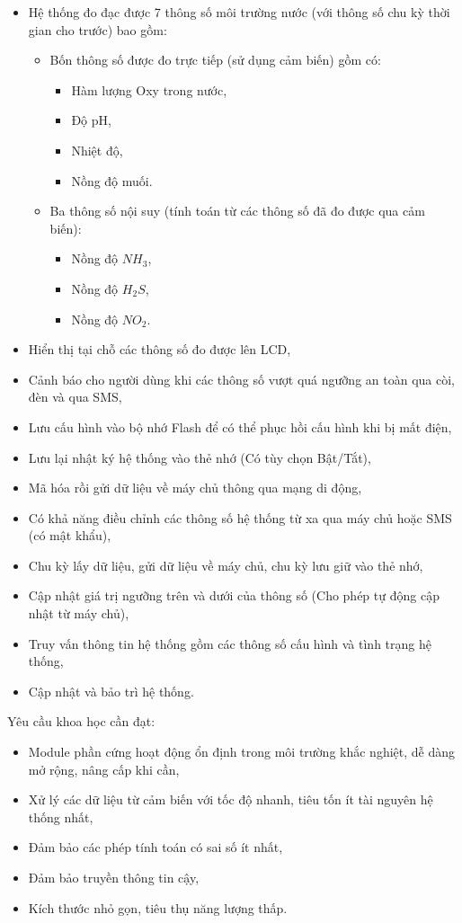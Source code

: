 \begin{itemize}
\item Hệ thống đo đạc được 7 thông số môi trường nước (với thông số chu kỳ thời gian cho trước) bao gồm:
	\begin{itemize}
	\item Bốn thông số được đo trực tiếp (sử dụng cảm biến) gồm có:
 		\begin{itemize}
		\item	Hàm lượng Oxy trong nước,
		\item   Độ pH,
		\item	Nhiệt độ,
		\item	Nồng độ muối.
		\end{itemize}
	\item Ba thông số nội suy (tính toán từ các thông số đã đo được qua cảm biến):
 		\begin{itemize}
		\item	Nồng độ $NH_3$,
		\item	Nồng độ $H_2S$,
		\item	Nồng độ $NO_2$.
 		\end{itemize}
 	\end{itemize}
\item Hiển thị tại chỗ các thông số đo được lên LCD,
\item Cảnh báo cho người dùng khi các thông số vượt quá ngưỡng an toàn qua còi, đèn và qua SMS,
\item Lưu cấu hình vào bộ nhớ Flash để có thể phục hồi cấu hình khi bị mất điện,
\item Lưu lại nhật ký hệ thống vào thẻ nhớ (Có tùy chọn Bật/Tắt),
\item Mã hóa rồi gửi dữ liệu về máy chủ thông qua mạng di động,
\item Có khả năng điều chỉnh các thông số hệ thống từ xa qua máy chủ hoặc SMS (có mật khẩu),
\item Chu kỳ lấy dữ liệu, gửi dữ liệu về máy chủ, chu kỳ lưu giữ vào thẻ nhớ,
\item Cập nhật giá trị ngưỡng trên và dưới của thông số (Cho phép tự động cập nhật từ máy chủ),
\item Truy vấn thông tin hệ thống gồm các thông số cấu hình và tình trạng hệ thống,
\item Cập nhật và bảo trì hệ thống.
\end{itemize}
\par 
Yêu cầu khoa học cần đạt:
	\begin{itemize}
	\item Module phần cứng hoạt động ổn định trong môi trường khắc nghiệt, dễ dàng mở rộng, nâng cấp khi cần,
	\item Xử lý các dữ liệu từ cảm biến với tốc độ nhanh, tiêu tốn ít tài nguyên hệ thống nhất,
	\item Đảm bảo các phép tính toán có sai số ít nhất,
	\item Đảm bảo truyền thông tin cậy,
	\item Kích thước nhỏ gọn, tiêu thụ năng lượng thấp.
	\end{itemize}
